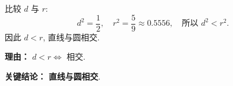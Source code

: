\begin{examplebox}
\begin{description}[style=nextline, leftmargin=2.8em, labelsep=0.5em, itemsep=0.45em]
		\item[\textbf{第三步（比较判断）：}] 比较 $d$ 与 $r$:
			\[
				d^2 = \frac12, \quad r^2 = \frac{5}{9}\approx0.5556,\quad\text{所以 }d^2<r^2.
			\]
			因此 $d<r$, 直线与圆相交.
			\par\textbf{理由：} $d<r\Leftrightarrow$ 相交.
	\end{description}

	\textbf{\textcolor{CExample}{关键结论：}}
	\textbf{直线与圆相交}.
\end{examplebox}
